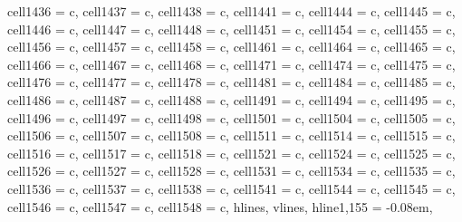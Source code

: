 {\begin{longtblr}[
  label = none,
  entry = none,
]
{  cell{143}{6} = {c},
  cell{143}{7} = {c},
  cell{143}{8} = {c},
  cell{144}{1} = {c},
  cell{144}{4} = {c},
  cell{144}{5} = {c},
  cell{144}{6} = {c},
  cell{144}{7} = {c},
  cell{144}{8} = {c},
  cell{145}{1} = {c},
  cell{145}{4} = {c},
  cell{145}{5} = {c},
  cell{145}{6} = {c},
  cell{145}{7} = {c},
  cell{145}{8} = {c},
  cell{146}{1} = {c},
  cell{146}{4} = {c},
  cell{146}{5} = {c},
  cell{146}{6} = {c},
  cell{146}{7} = {c},
  cell{146}{8} = {c},
  cell{147}{1} = {c},
  cell{147}{4} = {c},
  cell{147}{5} = {c},
  cell{147}{6} = {c},
  cell{147}{7} = {c},
  cell{147}{8} = {c},
  cell{148}{1} = {c},
  cell{148}{4} = {c},
  cell{148}{5} = {c},
  cell{148}{6} = {c},
  cell{148}{7} = {c},
  cell{148}{8} = {c},
  cell{149}{1} = {c},
  cell{149}{4} = {c},
  cell{149}{5} = {c},
  cell{149}{6} = {c},
  cell{149}{7} = {c},
  cell{149}{8} = {c},
  cell{150}{1} = {c},
  cell{150}{4} = {c},
  cell{150}{5} = {c},
  cell{150}{6} = {c},
  cell{150}{7} = {c},
  cell{150}{8} = {c},
  cell{151}{1} = {c},
  cell{151}{4} = {c},
  cell{151}{5} = {c},
  cell{151}{6} = {c},
  cell{151}{7} = {c},
  cell{151}{8} = {c},
  cell{152}{1} = {c},
  cell{152}{4} = {c},
  cell{152}{5} = {c},
  cell{152}{6} = {c},
  cell{152}{7} = {c},
  cell{152}{8} = {c},
  cell{153}{1} = {c},
  cell{153}{4} = {c},
  cell{153}{5} = {c},
  cell{153}{6} = {c},
  cell{153}{7} = {c},
  cell{153}{8} = {c},
  cell{154}{1} = {c},
  cell{154}{4} = {c},
  cell{154}{5} = {c},
  cell{154}{6} = {c},
  cell{154}{7} = {c},
  cell{154}{8} = {c},
  hlines,
  vlines,
  hline{1,155} = {-}{0.08em},
}


\end{longtblr}}
